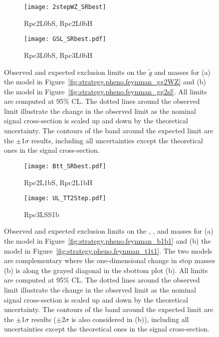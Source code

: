 \begin{figure}[p]
\centering
\begin{subfigure}[t]{0.45\textwidth}\texttt{[image: 2stepWZ\_SRbest]}\caption{Rpc2L0bS, Rpc2L0bH}\label{fig:limits_feynman_gg2WZ}\end{subfigure}
\begin{subfigure}[t]{0.45\textwidth}\texttt{[image: GSL\_SRbest.pdf]}\caption{Rpc3L0bS, Rpc3L0bH}\label{fig:limits_feynman_gg2sl}\end{subfigure}
\caption{Observed and expected exclusion limits on the $\tilde{g}$ and \ninoone masses 
for (a) the model in Figure~\ref{fig:strategy.pheno.feynman_gg2WZ} 
and (b) the model in Figure~\ref{fig:strategy.pheno.feynman_gg2sl}. 
All limits are computed at 95\% CL. The dotted lines around the observed
limit illustrate the change in the observed limit as the nominal signal cross-section is scaled up and down
by the theoretical uncertainty. The contours of the band around the expected 
limit are the $\pm$1$\sigma$ results,
including all uncertainties except the theoretical ones in the signal cross-section.}
\label{fig:Results_Limits_RPC} 
\end{figure} 

\begin{figure}[b]
\centering
\begin{subfigure}[t]{0.45\textwidth}\texttt{[image: Btt\_SRbest.pdf]}\caption{Rpc2L1bS, Rpc2L1bH}\label{fig:limits_feynman_b1b1}\end{subfigure}
\begin{subfigure}[t]{0.45\textwidth}\texttt{[image: UL\_TT2Step.pdf]}\caption{Rpc3LSS1b}\label{fig:limits_feynman_t1t1}\end{subfigure}
\caption{
Observed and expected exclusion limits on the  \sbottomone, \stopone, and \ninoone masses 
for (a) the model in Figure~\ref{fig:strategy.pheno.feynman_b1b1}
and (b) the model in Figure~\ref{fig:strategy.pheno.feynman_t1t1}. 
The two models are complementary where the one-dimensional change in stop masses (b) is along the grayed diagonal in the sbottom plot (b).
All limits are computed at 95\% CL. The dotted lines around the observed
limit illustrate the change in the observed limit as the nominal signal cross-section is scaled up and down
by the theoretical uncertainty. The contours of the band around the expected 
limit are the $\pm$1$\sigma$ results  ($\pm$2$\sigma$ is also considered in (b)),
including all uncertainties except the theoretical ones in the signal cross-section.
}
\label{fig:Results_Limits_NUHM2} 
\end{figure} 

